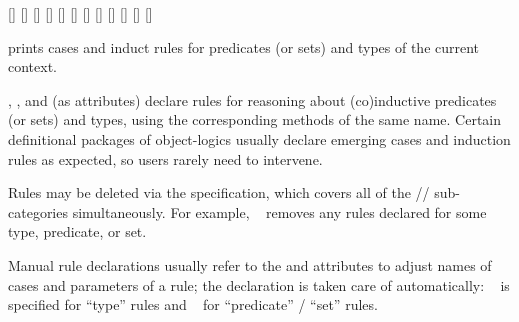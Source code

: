 \begin{isabellebody}
\begin{isamarkuptext}
  \begin{railoutput}
[]
[]
\rail@end
{}
[]
[]
\rail@end
{}
[]
[]
\rail@end
{}
\rail@bar
\rail@bar
{}[]
[]
[]
\rail@endbar
{}[]
[]
[]
\rail@endbar
\rail@end
\end{railoutput}


  \begin{description}

  \item \hyperlink{command.print-induct-rules}{\mbox{}} prints cases and induct rules
  for predicates (or sets) and types of the current context.

  \item \hyperlink{attribute.cases}{\mbox{}}, \hyperlink{attribute.induct}{\mbox{}}, and \hyperlink{attribute.coinduct}{\mbox{}} (as attributes) declare rules for reasoning about
  (co)inductive predicates (or sets) and types, using the
  corresponding methods of the same name.  Certain definitional
  packages of object-logics usually declare emerging cases and
  induction rules as expected, so users rarely need to intervene.

  Rules may be deleted via the  specification, which
  covers all of the //
  sub-categories simultaneously.  For example, \hyperlink{attribute.cases}{\mbox{}}~ removes any \hyperlink{attribute.cases}{\mbox{}} rules declared for
  some type, predicate, or set.
  
  Manual rule declarations usually refer to the \hyperlink{attribute.case-names}{\mbox{}} and \hyperlink{attribute.params}{\mbox{}} attributes to adjust names of
  cases and parameters of a rule; the \hyperlink{attribute.consumes}{\mbox{}}
  declaration is taken care of automatically: \hyperlink{attribute.consumes}{\mbox{}}~ is specified for ``type'' rules and \hyperlink{attribute.consumes}{\mbox{}}~ for ``predicate'' / ``set'' rules.


\end{description}
\end{isamarkuptext}
\end{isabellebody}
